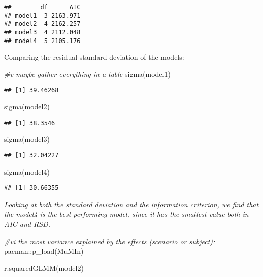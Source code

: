 \documentclass[
]{article}
\newenvironment{Shaded}{\begin{snugshade}}{\end{snugshade}}
\newcommand{\CommentTok}[1]{\textcolor[rgb]{0.56,0.35,0.01}{\textit{#1}}}
\newcommand{\FunctionTok}[1]{\textcolor[rgb]{0.00,0.00,0.00}{#1}}
\newcommand{\NormalTok}[1]{#1}
\newcommand{\SpecialCharTok}[1]{\textcolor[rgb]{0.00,0.00,0.00}{#1}}
\begin{document}
\begin{verbatim}
##        df      AIC
## model1  3 2163.971
## model2  4 2162.257
## model3  4 2112.048
## model4  5 2105.176
\end{verbatim}

Comparing the residual standard deviation of the models:

\begin{Shaded}
\begin{Highlighting}[]
\CommentTok{\#v maybe gather everything in a table}
\FunctionTok{sigma}\NormalTok{(model1)}
\end{Highlighting}
\end{Shaded}

\begin{verbatim}
## [1] 39.46268
\end{verbatim}

\begin{Shaded}
\begin{Highlighting}[]
\FunctionTok{sigma}\NormalTok{(model2)}
\end{Highlighting}
\end{Shaded}

\begin{verbatim}
## [1] 38.3546
\end{verbatim}

\begin{Shaded}
\begin{Highlighting}[]
\FunctionTok{sigma}\NormalTok{(model3)}
\end{Highlighting}
\end{Shaded}

\begin{verbatim}
## [1] 32.04227
\end{verbatim}

\begin{Shaded}
\begin{Highlighting}[]
\FunctionTok{sigma}\NormalTok{(model4)}
\end{Highlighting}
\end{Shaded}

\begin{verbatim}
## [1] 30.66355
\end{verbatim}

\emph{Looking at both the standard deviation and the information
criterion, we find that the model4 is the best performing model, since
it has the smallest value both in AIC and RSD.}

\begin{Shaded}
\begin{Highlighting}[]
\CommentTok{\#vi the most variance explained by the effects (scenario or subject):}
\NormalTok{pacman}\SpecialCharTok{::}\FunctionTok{p\_load}\NormalTok{(MuMIn)}

\FunctionTok{r.squaredGLMM}\NormalTok{(model2)}
\end{Highlighting}
\end{Shaded}
\end{document}

